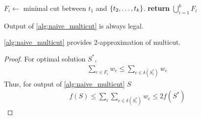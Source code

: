 \begin{algorithm}
	\caption{}\label{alg:naive_multicut}
	\begin{algorithmic}[1]
		\State $F_i \gets$ minimal cut between $t_1$ and $\qty{t_2,\dots, t_k}$.
		\EndFor
		\State \textbf{return} $\bigcup_{i=1}^k F_i$
		\EndProcedure
	\end{algorithmic}
\end{algorithm}

\begin{lemma}
	Output of \vref{alg:naive_multicut} is always legal.
\end{lemma}
\begin{lemma}
\vref{alg:naive_multicut} provides 2-approximation of multicut.
\begin{proof}
	For optimal solution $S^*$,
	\begin{align}
	\sum_{e\in F_i} w_e \leq \sum_{e\in \delta(S^*_i)} w_e
	\end{align}
	Thus, for output of \vref{alg:naive_multicut} $S$
	\begin{align}
	f(S)  \leq \sum_i \sum_{e\in \delta(S^*_i)} w_e \leq 2f(S^*)
	\end{align}
\end{proof}
\end{lemma}
